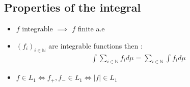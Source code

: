 \subsection{Properties of the integral}
\begin{itemize}

\item $f$ integrable $\implies$ $f$ finite a.e

\item $(f_i)_{i\in \mathbb{N}}$ are integrable functions then :
\begin{align}
\int \sum_{i\in \mathbb{N}} f_id\mu = \sum_{i\in \mathbb{N}} \int f_id\mu
\end{align}

\item $f \in L_1 \iff f_+, f_- \in L_1 \iff |f| \in L_1$
\end{itemize}


